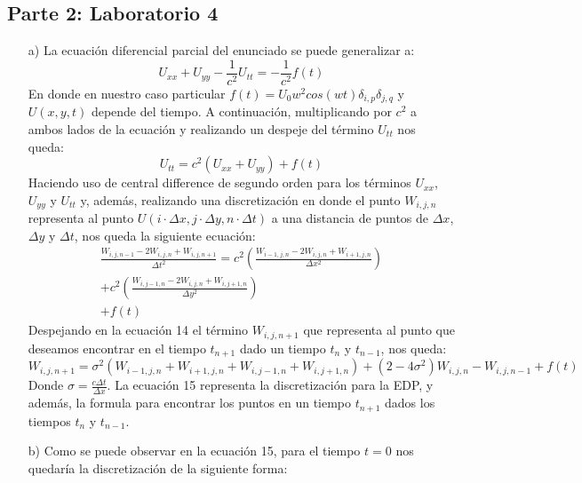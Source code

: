 \documentclass[letterpaper]{article}
\newcommand{\5}
{
\\[.5cm]
}
\begin{document}
\subsection{Parte 2: Laboratorio 4}
\begin{itemize}
\item[a)] La ecuación diferencial parcial del enunciado se puede generalizar a:
\begin{equation}
	U_{xx} + U_{yy} - \frac{1}{c^2} U_{tt} = -\frac{1}{c^2}f(t)
\end{equation}
	En donde en nuestro caso particular $f(t) = U_0 w^2 cos(wt) \delta_{i,p} \delta_{j,q}$ y $U(x,y,t)$ depende del tiempo. A continuación, multiplicando por $c^2$ a ambos lados de la ecuación y realizando un despeje del término $U_{tt}$ nos queda:
  	\begin{equation}
 		U_{tt} = c^2 ( U_{xx} + U_{yy}) + f(t)
    \end{equation}
    Haciendo uso de central difference de segundo orden para los términos $U_{xx}$, $U_{yy}$ y $U_{tt}$ y, además, realizando una discretización en donde el punto $W_{i,j,n}$ representa al punto $U(i \cdot \Delta x, j \cdot \Delta y, n \cdot \Delta t)$ a una distancia de puntos de $\Delta x$, $\Delta y$ y $\Delta t$, nos queda la siguiente ecuación:
    \begin{equation}
    \begin{split}
    	\frac{W_{i,j,n-1} - 2W_{i,j,n} + W_{i,j,n+1}}{\Delta t^2} = c^2 \left(\frac{W_{i-1,j,n} - 2W_{i,j,n} + W_{i+1,j,n}}{\Delta x^2}\right)\\ + c^2 \left(\frac{W_{i,j-1,n} - 2W_{i,j,n} + W_{i,j+1,n}}{\Delta y^2}\right) \\
        + f(t)
    \end{split}
    \end{equation}
    Despejando en la ecuación 14 el término $W_{i,j,n+1}$ que representa al punto que deseamos encontrar en el tiempo $t_{n+1}$ dado un tiempo $t_{n}$ y $t_{n-1}$, nos queda:
    \begin{equation}
    	W_{i,j,n+1} = \sigma^2 (W_{i-1,j,n} + W_{i+1,j,n} + W_{i,j-1,n} + W_{i,j+1,n}) + (2 - 4\sigma^2) W_{i,j,n} -W_{i,j,n-1} + f(t)
    \end{equation}
    Donde $\sigma = \frac{c \Delta t}{\Delta x}$. La ecuación 15 representa la discretización para la EDP, y además, la formula para encontrar los puntos en un tiempo $t_{n+1}$ dados los tiempos $t_{n}$ y $t_{n-1}$.
   \item[b)] Como se puede observar en la ecuación 15, para el tiempo $t = 0$ nos quedaría la discretización de la siguiente forma: 

\end{itemize}
\end{document}
